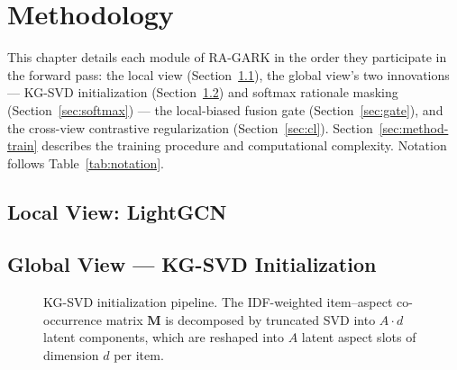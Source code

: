 \chapter{Methodology}
\label{ch:methodology}

This chapter details each module of RA-GARK in the order they participate in the forward pass: the local view (Section~\ref{sec:local}), the global view's two innovations --- KG-SVD initialization (Section~\ref{sec:kgsvd}) and softmax rationale masking (Section~\ref{sec:softmax}) --- the local-biased fusion gate (Section~\ref{sec:gate}), and the cross-view contrastive regularization (Section~\ref{sec:cl}). Section~\ref{sec:method-train} describes the training procedure and computational complexity. Notation follows Table~\ref{tab:notation}.

\section{Local View: LightGCN}
\label{sec:local}


\section{Global View — KG-SVD Initialization}
\label{sec:kgsvd}


\begin{figure}[ht]
  \centering
  \caption{KG-SVD initialization pipeline. The IDF-weighted item--aspect co-occurrence matrix $\mathbf{M}$ is decomposed by truncated SVD into $A \cdot d$ latent components, which are reshaped into $A$ latent aspect slots of dimension $d$ per item.}
  \label{fig:kgsvd}
\end{figure}

